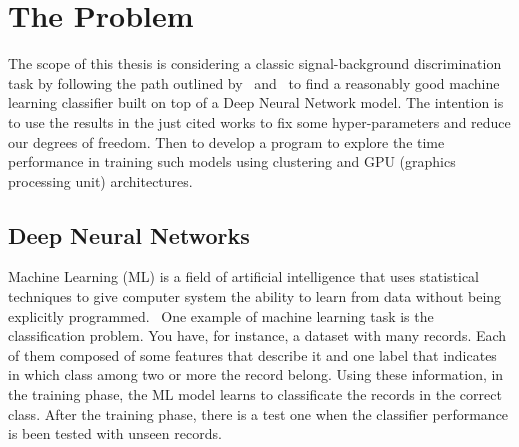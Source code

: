 \chapter{The Problem}

The scope of this thesis is considering a classic signal-background
discrimination task by following the path outlined by~\cite{paper}
and~\cite{gaia} to find a reasonably good machine learning classifier built
on top of a Deep Neural Network model. The intention is to use the results
in the just cited works to fix some hyper-parameters and reduce our degrees
of freedom. Then to develop a program to explore the time
performance in training such models using clustering and GPU (graphics
processing unit) architectures.

\section{Deep Neural Networks}

Machine Learning (ML) is a field of artificial intelligence that uses
statistical techniques to give computer system the ability to learn from
data without being explicitly programmed.~\cite{ML} One example of machine learning
task is the classification problem. You have, for instance, a dataset with
many records. Each of them composed of some features that
describe it and one label that indicates in which class among two or more
the record belong. Using these information, in the training phase, the
ML model learns to classificate the records in the correct class. After the
training phase, there is a test one when the classifier performance is been
tested with unseen records.

